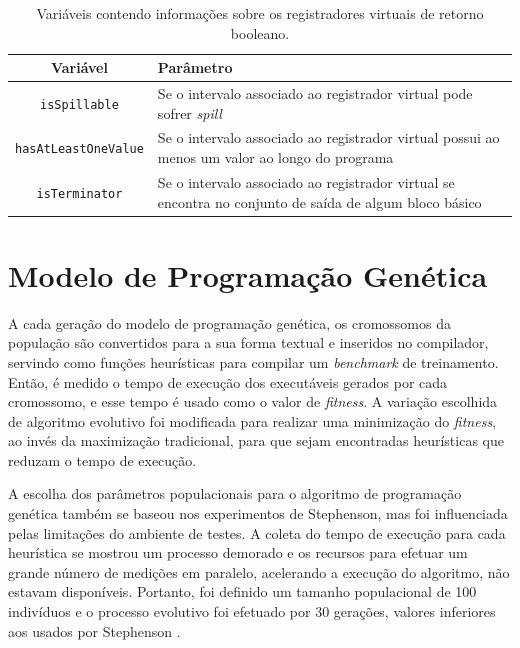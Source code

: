 \documentclass[
	12pt,				%
	openright,			%
	twoside,			%
	a4paper,			%
	tcc,			%
	]{ABNT-DC-UEL}
\begin{document}
\begin{table}[htb]
    \centering
    \begin{tabular}{cp{11cm}}
        \hline
        \textbf{Variável} & \textbf{Parâmetro} \\
        \hline
        \hline
        \texttt{isSpillable} & Se o intervalo associado ao registrador virtual pode sofrer \textit{spill} \\
        \hline
        \texttt{hasAtLeastOneValue} & Se o intervalo associado ao registrador virtual possui ao menos um valor ao longo do programa \\
        \hline
        \texttt{isTerminator} & Se o intervalo associado ao registrador virtual se encontra no conjunto de saída de algum bloco básico \\
        \hline
    \end{tabular}
    \caption{Variáveis contendo informações sobre os registradores virtuais de retorno booleano.}
    \label{tab:terminais-booleanos}
\end{table}

\section{Modelo de Programação Genética}

A cada geração do modelo de programação genética, os cromossomos da população são convertidos para a sua forma textual e inseridos no compilador, servindo como funções heurísticas para compilar um \textit{benchmark} de treinamento. Então, é medido o tempo de execução dos executáveis gerados por cada cromossomo, e esse tempo é usado como o valor de \textit{fitness}. A variação escolhida de algoritmo evolutivo foi modificada para realizar uma minimização do \textit{fitness}, ao invés da maximização tradicional, para que sejam encontradas heurísticas que reduzam o tempo de execução.

A escolha dos parâmetros populacionais para o algoritmo de programação genética também se baseou nos experimentos de Stephenson, mas foi influenciada pelas limitações do ambiente de testes. A coleta do tempo de execução para cada heurística se mostrou um processo demorado e os recursos para efetuar um grande número de medições em paralelo, acelerando a execução do algoritmo, não estavam disponíveis. Portanto, foi definido um tamanho populacional de 100 indivíduos e o processo evolutivo foi efetuado por 30 gerações, valores inferiores aos usados por Stephenson \cite{amarasinghe:03, stephenson:06}. 
\end{document}
